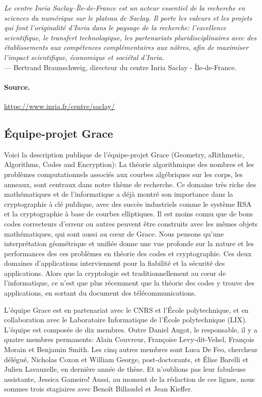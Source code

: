 \documentclass[a4paper, titlepage, 11pt]{article}
\theoremstyle{definition}
\theoremstyle{remark}
\begin{document}
\textit{\og{}Le centre Inria Saclay--Île-de-France est un acteur essentiel de la recherche en sciences du numérique sur le plateau de Saclay. Il porte les valeurs et les projets qui font l’originalité d’Inria dans le paysage de la recherche: l’excellence scientifique, le transfert technologique, les partenariats pluridisciplinaires avec des établissements aux compétences complémentaires aux nôtres, afin de maximiser l’impact scientifique, économique et sociétal d’Inria.\fg{}} \\
--- Bertrand Braunschweig, directeur du centre Inria Saclay - Île-de-France.

\paragraph{Source.} \url{https://www.inria.fr/centre/saclay/}

\subsection{Équipe-projet Grace}
Voici la description publique de l'équipe-projet Grace (Geometry, aRithmetic, Algorithms, Codes and Encryption): \og{}La théorie algorithmique des nombres et les problèmes computationnels associés aux courbes algébriques sur les corps, les anneaux, sont centraux dans notre thème de recherche. Ce domaine très riche des mathématiques et de l'informatique a déjà montré son importance dans la cryptographie à clé publique, avec des succès industriels comme le système RSA et la cryptographie à base de courbes elliptiques. Il est moins connu que de bons codes correcteurs d'erreur ou autres peuvent être construits avec les mêmes objets mathématiques, qui sont aussi au c\oe ur de Grace. Nous pensons qu'une interprétation géométrique et unifiée donne une vue profonde sur la nature et les performances des ces problèmes en théorie des codes et cryptographie. Ces deux domaines d'applications interviennent pour la fiabilité et la sécurité des applications. Alors que la cryptologie est traditionnellement au c\oe ur de l'informatique, ce n'est que plus récemment que la théorie des codes y trouve des applications, en sortant du document des télécommunications.\fg{}

L'équipe Grace est en partenariat avec le CNRS et l'École polytechnique, et en collaboration avec le Laboratoire Informatique de l'École polytechnique (LIX).
L'équipe est composée de dix membres. Outre Daniel Augot, le responsable, il y a quatre membres permanents: Alain Couvreur, Françoise Levy-dit-Vehel, François Morain et Benjamin Smith. Les cinq autres membres sont Luca De Feo, chercheur délégué, Nicholas Coxon et William George, post-doctorants, et Élise Barelli et Julien Lavauzelle, en dernière année de thèse.
Et n'oublions pas leur fabuleuse assistante, Jessica Gameiro!
Aussi, au moment de la rédaction de ces lignes, nous sommes trois stagiaires avec Benoît Billaudel et Jean Kieffer.
\end{document}
